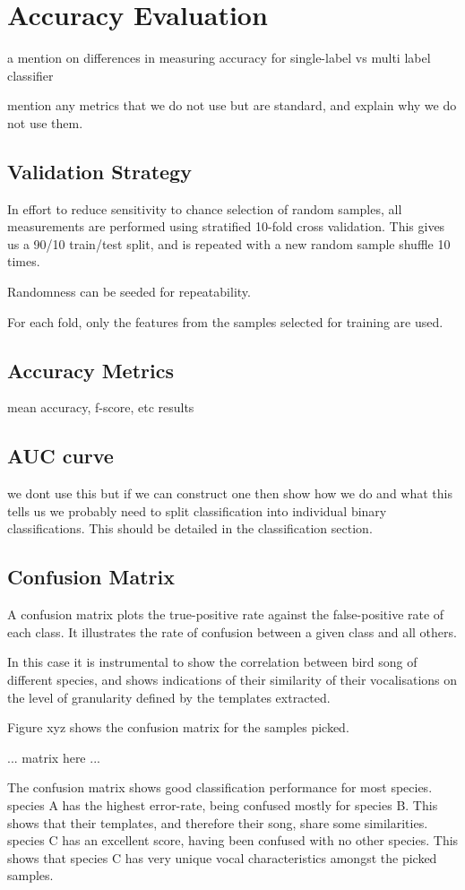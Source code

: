 \section{Accuracy Evaluation}

a mention on differences in measuring accuracy for single-label vs multi
label classifier

mention any metrics that we do not use but are standard, and explain
why we do not use them.

\subsection{Validation Strategy}
In effort to reduce sensitivity to chance selection of random samples, all
measurements are performed using stratified 10-fold cross validation.
This gives us a 90/10 train/test split, and is repeated with a new random sample
shuffle 10 times.

Randomness can be seeded for repeatability.

For each fold, only the features from the samples selected for training are
used.

\subsection{Accuracy Metrics}
mean accuracy, f-score, etc
results

\subsection{AUC curve}
we dont use this but if we can construct one then show how we do and what
this tells us
we probably need to split classification into individual binary classifications.
This should be detailed in the classification section.

\subsection{Confusion Matrix}
A confusion matrix plots the true-positive rate against the false-positive rate
of each class.
It illustrates the rate of confusion between a given class and all others.

In this case it is instrumental to show the correlation between bird song of
different species, and shows indications of their similarity of their
vocalisations on the level of granularity defined by the templates extracted.

Figure xyz shows the confusion matrix for the samples picked.

... matrix here ...

The confusion matrix shows good classification performance for most species.\\

species A has the highest error-rate, being confused mostly for species B.
This shows that their templates, and therefore their song, share some
similarities.\\

species C has an excellent score, having been confused with no other species.
This shows that species C has very unique vocal characteristics amongst the
picked samples.
